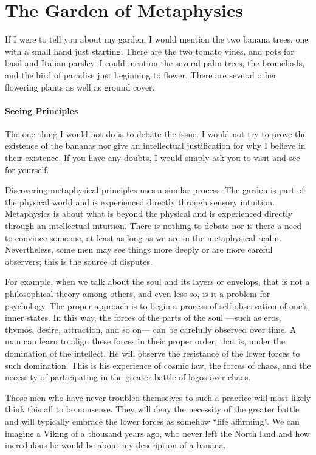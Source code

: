 \section{The Garden of Metaphysics}

If I were to tell you about my garden, I would mention the two banana trees, one with a small hand just starting. There are the two tomato vines, and pots for basil and Italian parsley. I could mention the several palm trees, the bromeliads, and the bird of paradise just beginning to flower. There are several other flowering plants as well as ground cover.

\paragraph{Seeing Principles}
The one thing I would not do is to debate the issue. I would not try to prove the existence of the bananas nor give an intellectual justification for why I believe in their existence. If you have any doubts, I would simply ask you to visit and see for yourself.

Discovering metaphysical principles uses a similar process. The garden is part of the physical world and is experienced directly through sensory intuition. Metaphysics is about what is beyond the physical and is experienced directly through an intellectual intuition. There is nothing to debate nor is there a need to convince someone, at least as long as we are in the metaphysical realm. Nevertheless, some men may see things more deeply or are more careful observers; this is the source of disputes.

For example, when we talk about the soul and its layers or envelops, that is not a philosophical theory among others, and even less so, is it a problem for psychology. The proper approach is to begin a process of self-observation of one's inner states. In this way, the forces of the parts of the soul —such as eros, thymos, desire, attraction, and so on— can be carefully observed over time. A man can learn to align these forces in their proper order, that is, under the domination of the intellect. He will observe the resistance of the lower forces to such domination. This is his experience of cosmic law, the forces of chaos, and the necessity of participating in the greater battle of logos over chaos.

Those men who have never troubled themselves to such a practice will most likely think this all to be nonsense. They will deny the necessity of the greater battle and will typically embrace the lower forces as somehow “life affirming”. We can imagine a Viking of a thousand years ago, who never left the North land and how incredulous he would be about my description of a banana.


